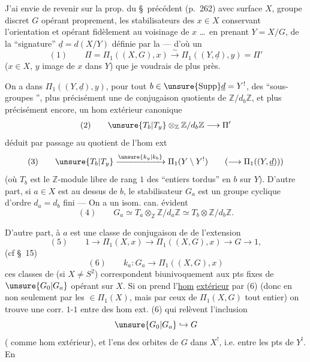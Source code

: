 J'ai envie de revenir sur la prop. du \S\ précédent
(p.\ 262) avec surface  $X$, groupe discret $G$
opérant proprement, les stabilisateurs  des $x\in X$
 conservant l'orientation et opérant fidèlement
au voisinage de $x$ \ldots\ en prenant $Y=X/G$,  de la
``signature'' $\underline d=d(X/Y)$ définie par la 
--- d'où un \uline{}
\[
(1)\qquad
\Pi=\Pi_1((X,G),x)\xrightarrow{\sim}\Pi_1((Y,\underline d),y)=\Pi'
\]
($x\in X$, $y$ image de $x$ dans $Y$)
que je voudrais  de plus près.

On a dans $\Pi_1((Y,\underline d),y)$, pour tout
$b\in\unsure{\operatorname{Supp}}\underline d=Y^!$,
des ``sous-groupes '', plus précisément
une  de conjugaison  
quotients de $\mathbb Z/d_b\mathbb Z$, et plus précisément encore,
un hom extérieur canonique
\[
(2)\qquad
\unsure{T_b|T_y}\otimes_{\mathbb Z}\mathbb Z/d_b\mathbb Z
\longrightarrow\Pi'
\]
déduit par passage au quotient de l'hom ext
\[
(3)\qquad
\unsure{T_b|T_y}\xrightarrow{\unsure{k_y|k_b}}
\Pi_1(Y\setminus Y^!)
\qquad(\longrightarrow\Pi_1((Y,\underline d)))
\]
(où $T_b$ est le $\mathbb Z$-module libre de rang $1$ des
``entiers tordus'' en $b$ sur $Y$). D'autre part,
si $a\in X$ est au dessus de $b$, le stabilisateur $G_a$ est
 un groupe cyclique d'ordre $d_a=d_b$
fini --- On a \unsure{$=$} un isom. can. évident
\[
(4)\qquad
G_a\simeq T_a\otimes_{\mathbb Z}\mathbb Z/d_a\mathbb Z
\simeq T_b\otimes\mathbb Z/d_b\mathbb Z.
\]


D'autre part, à $a$ est  une classe de
conjugaison de  de l'extension
\[
(5)\qquad
1\longrightarrow\Pi_1(X,x)\longrightarrow\Pi_1((X,G),x)
\longrightarrow G\longrightarrow1,
\]
(cf \S\ 15)
\[
(6)\qquad
k_a:G_a\longrightarrow\Pi_1((X,G),x)
\]
ces classes 
de  (si $X\ne S^2$) correspondent
biunivoquement aux pts fixes de $\unsure{G_0|G_a}$ opérant sur $X$.
Si on prend l'\uline{hom} \uline{extérieur} 
par (6) (donc en  non seulement par les
$\in\Pi_1(X)$, mais par ceux de $\Pi_1(X,G)$ tout entier)
on trouve une corr. $1$-$1$ entre 
des hom ext. (6) qui relèvent l'inclusion
\[
\unsure{G_0|G_a}\hookrightarrow G
\]
( comme hom extérieur), et l'ens des orbites de $G$
dans $X^!$, i.e. entre les pts de $Y^!$. En 

